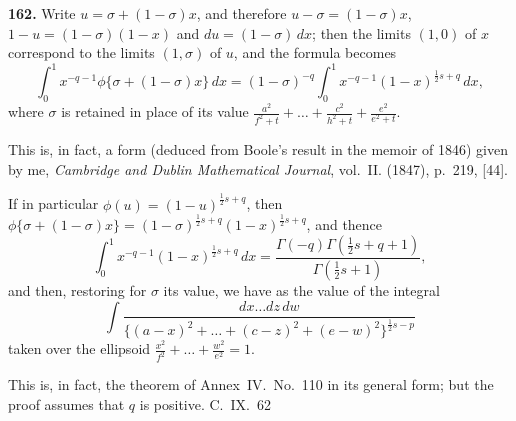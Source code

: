 \documentclass[11pt,a4paper]{book}
\begin{document}
{\medskip
\noindent\textbf{162.}
Write $u = \sigma + (1-\sigma)x$, and therefore $u-\sigma = (1-\sigma)x$, $1-u = (1-\sigma)(1-x)$ and $du = (1-\sigma)\, dx$; then the limits $(1, 0)$ of $x$ correspond to the limits $(1, \sigma)$ of $u$, and the formula becomes
\[
\int_0^1 x^{-q-1} \phi\{\sigma + (1-\sigma)x\}\, dx = (1-\sigma)^{-q} \int_0^1 x^{-q-1}(1-x)^{\frac{1}{2}s+q}\, dx,
\]
where $\sigma$ is retained in place of its value $\frac{a^2}{f^2+t} + \ldots + \frac{c^2}{h^2+t} + \frac{e^2}{e^2+t}$.

This is, in fact, a form (deduced from Boole's result in the memoir of 1846) given by me, \textit{Cambridge and Dublin Mathematical Journal}, vol.~II. (1847), p.~219, [44].

If in particular $\phi(u) = (1-u)^{\frac{1}{2}s+q}$, then $\phi\{\sigma+(1-\sigma)x\} = (1-\sigma)^{\frac{1}{2}s+q}(1-x)^{\frac{1}{2}s+q}$, and thence
\[
\int_0^1 x^{-q-1}(1-x)^{\frac{1}{2}s+q}\, dx = \frac{\Gamma(-q)\Gamma(\frac{1}{2}s+q+1)}{\Gamma(\frac{1}{2}s+1)},
\]
and then, restoring for $\sigma$ its value, we have as the value of the integral
\[
\int \frac{dx\ldots dz\, dw}{\{(a-x)^2 + \ldots + (c-z)^2 + (e-w)^2\}^{\frac{1}{2}s-p}}
\]
taken over the ellipsoid $\frac{x^2}{f^2} + \ldots + \frac{w^2}{e^2} = 1$.

This is, in fact, the theorem of Annex~IV.\ No.~110 in its general form; but the proof assumes that $q$ is positive.
\hfill C.~IX.\ 62

} %
\end{document}
